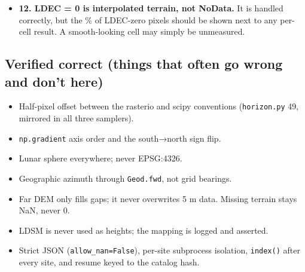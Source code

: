 \documentclass[11pt,a4paper]{article}
\providecommand{\tightlist}{\setlength{\itemsep}{0pt}\setlength{\parskip}{0pt}}
\begin{document}
\begin{itemize}
  \begin{itemize}
  \tightlist
  \item
    it stores \texttt{Last-Modified} but never compares
    it on resume, so a file that changed on the server mid-download
    would produce a mixed file;
  \item
    the SHA-256 is recorded but not checked against a published value;
  \item
    if the checkpoint is deleted after preallocation, the full-size
    \texttt{.part} is taken as complete (line 26).
  \end{itemize}
\item
  \textbf{12. LDEC = 0 is interpolated terrain, not NoData.} It is
  handled correctly, but the \% of LDEC-zero pixels should be shown next
  to any per-cell result. A smooth-looking cell may simply be
  unmeasured.
\end{itemize}

\hypertarget{verified-correct-things-that-often-go-wrong-and-dont-here}{%
\subsection{Verified correct (things that often go wrong and don't
here)}\label{verified-correct-things-that-often-go-wrong-and-dont-here}}

\begin{itemize}
\tightlist
\item
  Half-pixel offset between the rasterio and scipy conventions
  (\texttt{horizon.py} 49, mirrored in all three
  samplers).
\item
  \texttt{np.gradient} axis order and the south→north
  sign flip.
\item
  Lunar sphere everywhere; never EPSG:4326.
\item
  Geographic azimuth through \texttt{Geod.fwd}, not
  grid bearings.
\item
  Far DEM only fills gaps; it never overwrites 5 m data. Missing terrain
  stays NaN, never 0.
\item
  LDSM is never used as heights; the mapping is logged and asserted.
\item
  Strict JSON (\texttt{allow\_nan=False}), per-site
  subprocess isolation, \texttt{index()} after every
  site, and resume keyed to the catalog hash.
\end{itemize}
\end{document}
